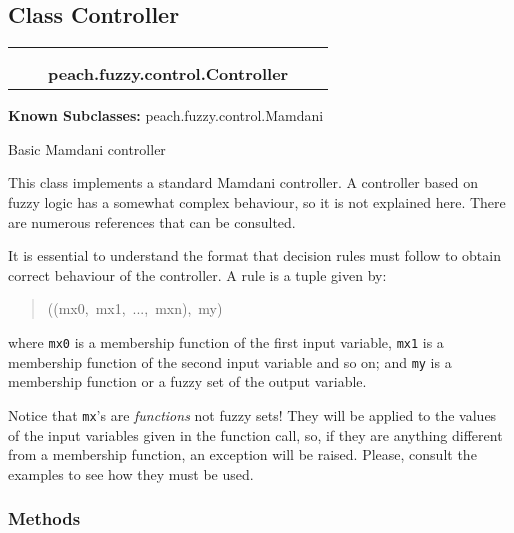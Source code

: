 \subsection{Class Controller}

    \label{peach:fuzzy:control:Controller}
\begin{tabular}{cccccc}
\multicolumn{2}{r}{\settowidth{\BCL}{object}\multirow{2}{\BCL}{object}}
&&
  \\\cline{3-3}
  &&\multicolumn{1}{c|}{}
&&
  \\
&&\multicolumn{2}{l}{\textbf{peach.fuzzy.control.Controller}}
\end{tabular}

\textbf{Known Subclasses:} peach.fuzzy.control.Mamdani


Basic Mamdani controller

This class implements a standard Mamdani controller. A controller based on
fuzzy logic has a somewhat complex behaviour, so it is not explained here.
There are numerous references that can be consulted.

It is essential to understand the format that decision rules must follow to
obtain correct behaviour of the controller. A rule is a tuple given by:
%
\begin{quote}{\ttfamily \raggedright \noindent
((mx0,~mx1,~...,~mxn),~my)
}
\end{quote}

where \texttt{mx0} is a membership function of the first input variable, \texttt{mx1}
is a membership function of the second input variable and so on; and \texttt{my}
is a membership function or a fuzzy set of the output variable.

Notice that \texttt{mx}'s are \emph{functions} not fuzzy sets! They will be applied to
the values of the input variables given in the function call, so, if they
are anything different from a membership function, an exception will be
raised. Please, consult the examples to see how they must be used.


  \subsubsection{Methods}

